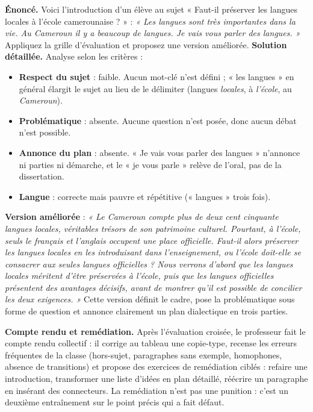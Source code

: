 \documentclass[11pt]{article}
\newcommand{\cle}[1]{{\popxbold\color{popdark}#1}}
\begin{document}
\begin{exoresolu}
\textbf{Énoncé.} Voici l'introduction d'un élève au sujet « Faut-il préserver les langues locales à l'école camerounaise ? » : \emph{« Les langues sont très importantes dans la vie. Au Cameroun il y a beaucoup de langues. Je vais vous parler des langues. »} Appliquez la grille d'évaluation et proposez une version améliorée.
\tcblower
\textbf{Solution détaillée.} Analyse selon les critères :
\begin{itemize}
\item \textbf{Respect du sujet} : faible. Aucun mot-clé n'est défini ; « les langues » en général élargit le sujet au lieu de le délimiter (langues \emph{locales}, à \emph{l'école}, au \emph{Cameroun}).
\item \textbf{Problématique} : absente. Aucune question n'est posée, donc aucun débat n'est possible.
\item \textbf{Annonce du plan} : absente. « Je vais vous parler des langues » n'annonce ni parties ni démarche, et le « je vous parle » relève de l'oral, pas de la dissertation.
\item \textbf{Langue} : correcte mais pauvre et répétitive (« langues » trois fois).
\end{itemize}
\textbf{Version améliorée} : \emph{« Le Cameroun compte plus de deux cent cinquante langues locales, véritables trésors de son patrimoine culturel. Pourtant, à l'école, seuls le français et l'anglais occupent une place officielle. Faut-il alors préserver les langues locales en les introduisant dans l'enseignement, ou l'école doit-elle se consacrer aux seules langues officielles ? Nous verrons d'abord que les langues locales méritent d'être préservées à l'école, puis que les langues officielles présentent des avantages décisifs, avant de montrer qu'il est possible de concilier les deux exigences. »} Cette version définit le cadre, pose la problématique sous forme de question et annonce clairement un plan dialectique en trois parties.
\end{exoresolu}

\textbf{Compte rendu et remédiation.} Après l'évaluation croisée, le professeur fait le \cle{compte rendu} collectif : il corrige au tableau une copie-type, recense les erreurs fréquentes de la classe (hors-sujet, paragraphes sans exemple, homophones, absence de transitions) et propose des exercices de \cle{remédiation} ciblés : refaire une introduction, transformer une liste d'idées en plan détaillé, réécrire un paragraphe en insérant des connecteurs. La remédiation n'est pas une punition : c'est un deuxième entraînement sur le point précis qui a fait défaut.
\end{document}
